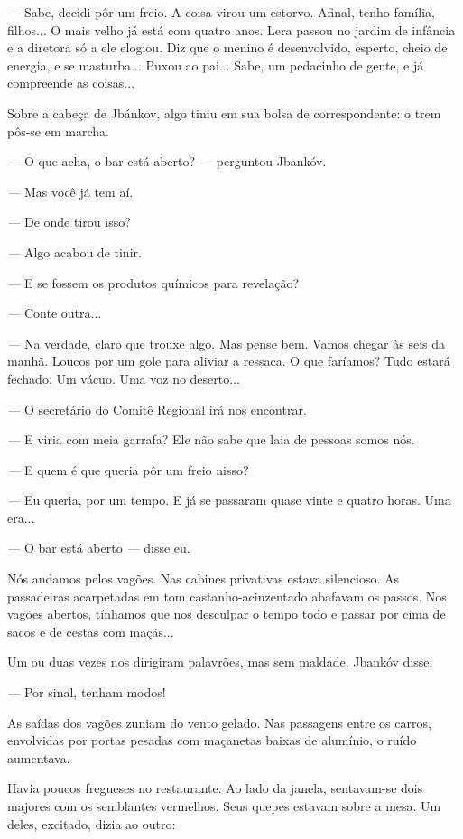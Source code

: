 \emph{---} Sabe, decidi pôr um freio. A coisa virou um estorvo. Afinal,
tenho família, filhos... O mais velho já está com quatro anos. Lera
passou no jardim de infância e a diretora só a ele elogiou. Diz que o
menino é desenvolvido, esperto, cheio de energia, e se masturba... Puxou
ao pai... Sabe, um pedacinho de gente, e já compreende as coisas...

Sobre a cabeça de Jbánkov, algo tiniu em sua bolsa de correspondente: o
trem pôs-se em marcha.

\emph{---} O que acha, o bar está aberto? \emph{---} perguntou Jbankóv.

\emph{---} Mas você já tem aí.

\emph{---} De onde tirou isso?

\emph{---} Algo acabou de tinir.

\emph{---} E se fossem os produtos químicos para revelação?

\emph{---} Conte outra...

\emph{---} Na verdade, claro que trouxe algo. Mas pense bem. Vamos
chegar às seis da manhã. Loucos por um gole para aliviar a ressaca. O
que faríamos? Tudo estará fechado. Um vácuo. Uma voz no deserto...

\emph{---} O secretário do Comitê Regional irá nos encontrar.

\emph{---} E viria com meia garrafa? Ele não sabe que laia de pessoas
somos nós.

\emph{---} E quem é que queria pôr um freio nisso?

\emph{---} Eu queria, por um tempo. E já se passaram quase vinte e
quatro horas. Uma era...

\emph{---} O bar está aberto \emph{---} disse eu.

Nós andamos pelos vagões. Nas cabines privativas estava silencioso. As
passadeiras acarpetadas em tom castanho-acinzentado abafavam os passos.
Nos vagões abertos, tínhamos que nos desculpar o tempo todo e passar por
cima de sacos e de cestas com maçãs...

Um ou duas vezes nos dirigiram palavrões, mas sem maldade. Jbankóv
disse:

\emph{---} Por sinal, tenham modos!

As saídas dos vagões zuniam do vento gelado. Nas passagens entre os
carros, envolvidas por portas pesadas com maçanetas baixas de alumínio,
o ruído aumentava.

Havia poucos fregueses no restaurante. Ao lado da janela, sentavam-se
dois majores com os semblantes vermelhos. Seus quepes estavam sobre a
mesa. Um deles, excitado, dizia ao outro:

